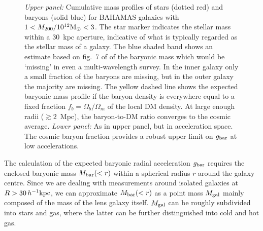 \documentclass[usenatbib]{mnras}
\newcommand{\hkpc}{\, h^{-1}{\rm{kpc}} }
\newcommand{\un}[1]{_{\rm #1}}
\begin{document}
\begin{figure}
	\caption{\emph{Upper panel: }Cumulative mass profiles of stars (dotted red) and baryons (solid blue) for BAHAMAS galaxies with $1<M_{200}/10^{12}{\rm M}_\odot<3$. The star marker indicates the stellar mass within a $30$~kpc aperture, indicative of what is typically regarded as the stellar mass of a galaxy. The blue shaded band shows an estimate based on fig.~7 of \citet{tumlinson2017} of the baryonic mass which would be `missing' in even a multi-wavelength survey. In the inner galaxy only a small fraction of the baryons are missing, but in the outer galaxy the majority are missing. The yellow dashed line shows the expected baryonic mass profile if the baryon density is everywhere equal to a fixed fraction $f_b=\Omega_b/\Omega_m$ of the local DM density. At large enough radii ($\gtrsim 2$~Mpc), the baryon-to-DM ratio converges to the cosmic average. \emph{Lower panel: } As in upper panel, but in acceleration space. The cosmic baryon fraction provides a robust upper limit on $g\un{bar}$ at low accelerations.}
	\label{fig:missing-baryons}
\end{figure}

The calculation of the expected baryonic radial acceleration $g\un{bar}$ requires the enclosed baryonic mass $M\un{bar}(<r)$ within a spherical radius $r$ around the galaxy centre. Since we are dealing with measurements around isolated galaxies at $R>30\hkpc$, we can approximate $M\un{bar}(<r)$ as a point mass $M\un{gal}$ mainly composed of the mass of the lens galaxy itself. $M\un{gal}$ can be roughly subdivided into stars and gas, where the latter can be further distinguished into cold and hot gas.
\end{document}
